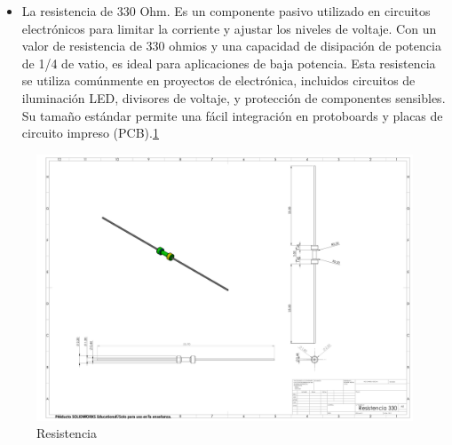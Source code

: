     \begin{itemize}
        \item 
        La resistencia de 330 Ohm. Es un componente pasivo utilizado en circuitos electrónicos para limitar la corriente y ajustar los niveles de voltaje. Con un valor de resistencia de 330 ohmios y una capacidad de disipación de potencia de 1/4 de vatio, es ideal para aplicaciones de baja potencia. Esta resistencia se utiliza comúnmente en proyectos de electrónica, incluidos circuitos de iluminación LED, divisores de voltaje, y protección de componentes sensibles. Su tamaño estándar permite una fácil integración en protoboards y placas de circuito impreso (PCB).\ref{fig:Resistencia}
    \end{itemize}
    \begin{figure}[H]
        \centering
        \includegraphics[trim = {10mm 10mm 10mm 10mm},clip,scale=0.120]{24/Img/Resistencia.pdf}
        \caption{Resistencia}
        \label{fig:Resistencia}
    \end{figure}
    
